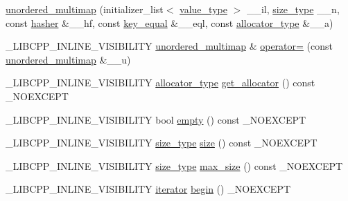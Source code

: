 \begin{DoxyCompactItemize}
\item 
\hyperlink{classunordered__multimap_a09bebef2465da44e4eebbdb744fa50ba}{unordered\+\_\+multimap} (initializer\+\_\+list$<$ \hyperlink{classunordered__multimap_a106d390dc0deafc47f10d3943b247ee6}{value\+\_\+type} $>$ \+\_\+\+\_\+il, \hyperlink{classunordered__multimap_a977c4093df6d4d0302f280de19af4b58}{size\+\_\+type} \+\_\+\+\_\+n, const \hyperlink{classunordered__multimap_a93affc33f5ee930cff353ff62d20daef}{hasher} \&\+\_\+\+\_\+hf, const \hyperlink{classunordered__multimap_aeed817e3baaf0771b8336eb2477f4f02}{key\+\_\+equal} \&\+\_\+\+\_\+eql, const \hyperlink{classunordered__multimap_a821ff3be687cecd9ef325efa93759c19}{allocator\+\_\+type} \&\+\_\+\+\_\+a)
\item 
\+\_\+\+L\+I\+B\+C\+P\+P\+\_\+\+I\+N\+L\+I\+N\+E\+\_\+\+V\+I\+S\+I\+B\+I\+L\+I\+T\+Y \hyperlink{classunordered__multimap}{unordered\+\_\+multimap} \& \hyperlink{classunordered__multimap_a79714c5cd7c01935d03ff987442fe2ca}{operator=} (const \hyperlink{classunordered__multimap}{unordered\+\_\+multimap} \&\+\_\+\+\_\+u)
\item 
\+\_\+\+L\+I\+B\+C\+P\+P\+\_\+\+I\+N\+L\+I\+N\+E\+\_\+\+V\+I\+S\+I\+B\+I\+L\+I\+T\+Y \hyperlink{classunordered__multimap_a821ff3be687cecd9ef325efa93759c19}{allocator\+\_\+type} \hyperlink{classunordered__multimap_a7265f5459ad95df57a42f8d43a32515a}{get\+\_\+allocator} () const \+\_\+\+N\+O\+E\+X\+C\+E\+P\+T
\item 
\+\_\+\+L\+I\+B\+C\+P\+P\+\_\+\+I\+N\+L\+I\+N\+E\+\_\+\+V\+I\+S\+I\+B\+I\+L\+I\+T\+Y bool \hyperlink{classunordered__multimap_a9ddf167fe2eefec358dd9b1949bb5d20}{empty} () const \+\_\+\+N\+O\+E\+X\+C\+E\+P\+T
\item 
\+\_\+\+L\+I\+B\+C\+P\+P\+\_\+\+I\+N\+L\+I\+N\+E\+\_\+\+V\+I\+S\+I\+B\+I\+L\+I\+T\+Y \hyperlink{classunordered__multimap_a977c4093df6d4d0302f280de19af4b58}{size\+\_\+type} \hyperlink{classunordered__multimap_a29e1e919824d4b9c696ef552eee446ff}{size} () const \+\_\+\+N\+O\+E\+X\+C\+E\+P\+T
\item 
\+\_\+\+L\+I\+B\+C\+P\+P\+\_\+\+I\+N\+L\+I\+N\+E\+\_\+\+V\+I\+S\+I\+B\+I\+L\+I\+T\+Y \hyperlink{classunordered__multimap_a977c4093df6d4d0302f280de19af4b58}{size\+\_\+type} \hyperlink{classunordered__multimap_aab604f937bdc80b9ec3b4f3c02cccf22}{max\+\_\+size} () const \+\_\+\+N\+O\+E\+X\+C\+E\+P\+T
\item 
\+\_\+\+L\+I\+B\+C\+P\+P\+\_\+\+I\+N\+L\+I\+N\+E\+\_\+\+V\+I\+S\+I\+B\+I\+L\+I\+T\+Y \hyperlink{classunordered__multimap_a7b508cae41ac3a258ca80609ec43db47}{iterator} \hyperlink{classunordered__multimap_a8a7f5de2dfa888b1b08dbab27d5b3f1f}{begin} () \+\_\+\+N\+O\+E\+X\+C\+E\+P\+T

\end{DoxyCompactItemize}
